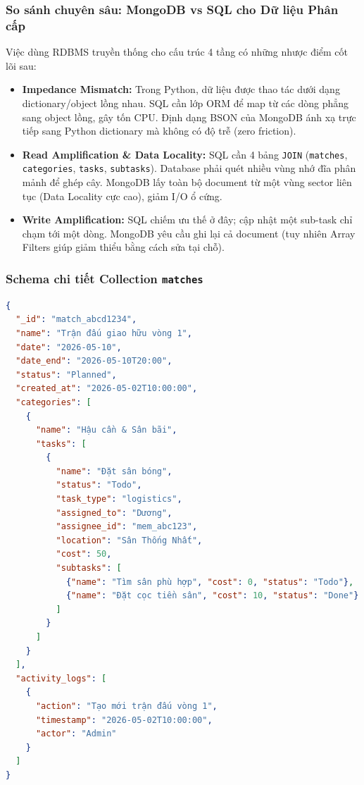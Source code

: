 \documentclass[a4paper,12pt]{article}
\begin{document}
\subsubsection{So sánh chuyên sâu: MongoDB vs SQL cho Dữ liệu Phân cấp}
Việc dùng RDBMS truyền thống cho cấu trúc 4 tầng có những nhược điểm cốt lõi sau:
\begin{itemize}
    \item \textbf{Impedance Mismatch:} Trong Python, dữ liệu được thao tác dưới dạng dictionary/object lồng nhau. SQL cần lớp ORM để map từ các dòng phẳng sang object lồng, gây tốn CPU. Định dạng BSON của MongoDB ánh xạ trực tiếp sang Python dictionary mà không có độ trễ (zero friction).
    \item \textbf{Read Amplification \& Data Locality:} SQL cần 4 bảng \texttt{JOIN} (\texttt{matches}, \texttt{categories}, \texttt{tasks}, \texttt{subtasks}). Database phải quét nhiều vùng nhớ đĩa phân mảnh để ghép cây. MongoDB lấy toàn bộ document từ một vùng sector liên tục (Data Locality cực cao), giảm I/O ổ cứng.
    \item \textbf{Write Amplification:} SQL chiếm ưu thế ở đây; cập nhật một sub-task chỉ chạm tới một dòng. MongoDB yêu cầu ghi lại cả document (tuy nhiên Array Filters giúp giảm thiểu bằng cách sửa tại chỗ).
\end{itemize}

\subsubsection{Schema chi tiết Collection \texttt{matches}}

\begin{lstlisting}[language=json, caption=Cấu trúc JSON đầy đủ của một document trong collection matches]
{
  "_id": "match_abcd1234",
  "name": "Trận đấu giao hữu vòng 1",
  "date": "2026-05-10",
  "date_end": "2026-05-10T20:00",
  "status": "Planned",
  "created_at": "2026-05-02T10:00:00",
  "categories": [
    {
      "name": "Hậu cần & Sân bãi",
      "tasks": [
        {
          "name": "Đặt sân bóng",
          "status": "Todo",
          "task_type": "logistics",
          "assigned_to": "Dương",
          "assignee_id": "mem_abc123",
          "location": "Sân Thống Nhất",
          "cost": 50,
          "subtasks": [
            {"name": "Tìm sân phù hợp", "cost": 0, "status": "Todo"},
            {"name": "Đặt cọc tiền sân", "cost": 10, "status": "Done"}
          ]
        }
      ]
    }
  ],
  "activity_logs": [
    {
      "action": "Tạo mới trận đấu vòng 1",
      "timestamp": "2026-05-02T10:00:00",
      "actor": "Admin"
    }
  ]
}
\end{lstlisting}
\end{document}

